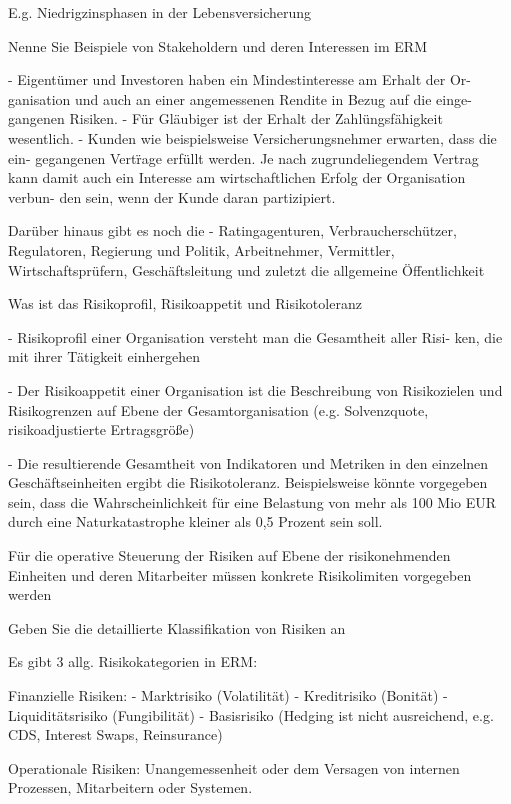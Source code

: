 E.g. Niedrigzinsphasen in der Lebensversicherung



Nenne Sie Beispiele von Stakeholdern und deren Interessen im ERM

- Eigentümer und Investoren haben ein Mindestinteresse am Erhalt der Or-
ganisation und auch an einer angemessenen Rendite in Bezug auf die einge-
gangenen Risiken.
- Für Gläubiger ist der Erhalt der Zahlüngsfähigkeit wesentlich.
- Kunden wie beispielsweise Versicherungsnehmer erwarten, dass die ein-
gegangenen Vertr̈age erfüllt werden. Je nach zugrundeliegendem Vertrag kann
damit auch ein Interesse am wirtschaftlichen Erfolg der Organisation verbun-
den sein, wenn der Kunde daran partizipiert.

Darüber hinaus gibt es noch die
- Ratingagenturen, Verbraucherschützer, Regulatoren, Regierung und Politik, Arbeitnehmer,
Vermittler, Wirtschaftsprüfern, Geschäftsleitung und zuletzt die allgemeine Öffentlichkeit



Was ist das Risikoprofil, Risikoappetit und Risikotoleranz

- Risikoprofil einer Organisation versteht man die Gesamtheit aller Risi-
ken, die mit ihrer Tätigkeit einhergehen

- Der Risikoappetit einer Organisation ist die Beschreibung von Risikozielen und
Risikogrenzen auf Ebene der Gesamtorganisation (e.g. Solvenzquote, risikoadjustierte Ertragsgröße)

- Die resultierende Gesamtheit von Indikatoren und Metriken in den einzelnen Geschäftseinheiten ergibt die Risikotoleranz.
Beispielsweise könnte vorgegeben sein, dass die Wahrscheinlichkeit für eine Belastung von mehr als
100 Mio EUR durch eine Naturkatastrophe kleiner als 0,5 Prozent sein soll.

Für die operative Steuerung der Risiken auf Ebene der risikonehmenden Einheiten
und deren Mitarbeiter müssen konkrete Risikolimiten vorgegeben werden



Geben Sie die detaillierte Klassifikation von Risiken an

Es gibt 3 allg. Risikokategorien in ERM:

Finanzielle Risiken:
- Marktrisiko (Volatilität)
- Kreditrisiko (Bonität)
- Liquiditätsrisiko (Fungibilität)
- Basisrisiko (Hedging ist nicht ausreichend, e.g. CDS, Interest Swaps, Reinsurance) 

Operationale Risiken:
Unangemessenheit oder dem Versagen von internen Prozessen, Mitarbeitern oder Systemen.

